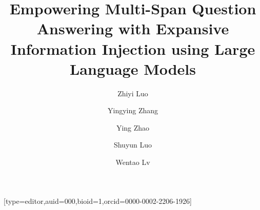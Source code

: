 \documentclass[a4paper,fleqn,twocolumn]{cas-dc}
\newcommand{\1}[1]{\mathds{1}\left[#1\right]}
\begin{document}
\let\WriteBookmarks\relax
\def\floatpagepagefraction{1}
\def\textpagefraction{.001}



\title{Empowering Multi-Span Question Answering with Expansive Information Injection using Large Language Models}  

\author{Zhiyi Luo}[type=editor,auid=000,bioid=1,orcid=0000-0002-2206-1926]

\author{Yingying Zhang}

\author{Ying Zhao}

\author{Shuyun Luo}
\cormark[1]

\author{Wentao Lv}

\address[mymainaddress]{School of Computer Science and Technology and the Key Laboratory of Intelligent Textile and Flexible Interconnection of Zhejiang Province, Zhejiang Sci-Tech University}
\address[mysecondaryaddress]{No. 928, No. 2 street, Baiyang street, Qiantang New District, Hangzhou 310018, China}


%
%
%
%
%
%
%
%
%
\end{document}
